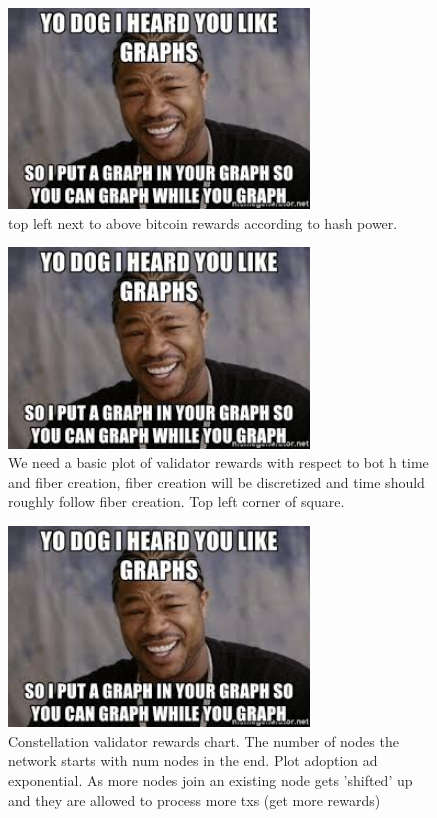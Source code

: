 \documentclass{article}
\begin{document}
\begin{figure}[h]
\caption{top left next to above bitcoin rewards according to hash power.}
\includegraphics[width=8cm]{yo_dawg}
\centering
\end{figure}

\begin{figure}[h]
\caption{We need a basic plot of validator rewards with respect to bot h time and fiber creation, fiber creation will be discretized and time should roughly follow fiber creation. Top left corner of square.}
\includegraphics[width=8cm]{yo_dawg}
\centering
\end{figure}

\begin{figure}[h]
\caption{Constellation validator rewards chart. The number of nodes the network starts with num nodes in the end. Plot adoption ad exponential. As more nodes join an existing node gets 'shifted' up and they are allowed to process more txs (get more rewards)}
\includegraphics[width=8cm]{yo_dawg}
\centering
\end{figure}
\end{document}
